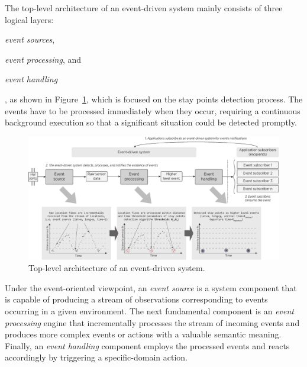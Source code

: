 \documentclass[ENG,PhD]{cinvestav}
\begin{document}
The top-level architecture of an event-driven system mainly consists of three logical layers: 
\begin{listahorizontal}
  \item \emph{event sources},
  \item \emph{event processing}, and
  \item \emph{event handling}
\end{listahorizontal}, as shown in Figure~\ref{fig:event-based-system-architecture}, which is focused on the stay points detection process.
The events have to be processed immediately when they occur, requiring a continuous background execution so that a significant situation could be detected promptly.

\begin{figure}
  \centering
  \includegraphics[width=\textwidth]{vectors/event-driven-system}
  \caption{Top-level architecture of an event-driven system.}
  \label{fig:event-based-system-architecture}
\end{figure}

Under the event-oriented viewpoint, an \emph{event source} is a system component that is capable of producing a stream of observations corresponding to events occurring in a given environment.
The next fundamental component is an \emph{event processing} engine that incrementally processes the stream of incoming events and produces more complex events or actions with a valuable semantic meaning.
Finally, an \emph{event handling} component employs the processed events and reacts accordingly by triggering a specific-domain action.
\end{document}

